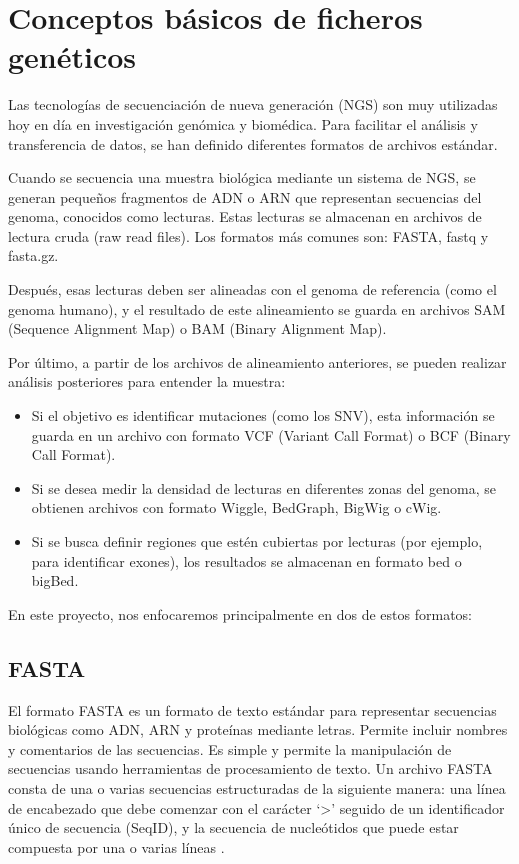 \documentclass[11pt,spanish,listoffigures,listoftables]{tfgetsinf}
\begin{document}
\section{Conceptos básicos de ficheros genéticos}

Las tecnologías de secuenciación de nueva generación (\acs{NGS}) son muy utilizadas hoy en día en investigación genómica y biomédica. Para facilitar el análisis y transferencia de datos, se han definido diferentes formatos de archivos estándar. 

Cuando se secuencia una muestra biológica mediante un sistema de \acs{NGS}, se generan pequeños fragmentos de \acs{ADN} o \acs{ARN} que representan secuencias del genoma, conocidos como lecturas. Estas lecturas se almacenan en archivos de lectura cruda (raw read files). Los formatos más comunes son: \acs{FASTA}, fastq y fasta.gz. 

Después, esas lecturas deben ser alineadas con el genoma de referencia (como el genoma humano), y el resultado de este alineamiento se guarda en archivos SAM (Sequence Alignment Map) o BAM (Binary Alignment Map). 

Por último, a partir de los archivos de alineamiento anteriores, se pueden realizar análisis posteriores para entender la muestra:  

\begin{itemize}
   \item Si el objetivo es identificar mutaciones (como los SNV), esta información se guarda en un archivo con formato \acs{VCF} (Variant Call Format) o BCF (Binary Call Format). 
   \item Si se desea medir la densidad de lecturas en diferentes zonas del genoma, se obtienen archivos con formato Wiggle, BedGraph, BigWig o cWig.
   \item Si se busca definir regiones que estén cubiertas por lecturas (por ejemplo, para identificar exones), los resultados se almacenan en formato bed o bigBed.
\end{itemize}

En este proyecto, nos enfocaremos principalmente en dos de estos formatos: 

\subsection{FASTA}

El formato \acs{FASTA} es un formato de texto estándar para representar secuencias biológicas como \acs{ADN}, \acs{ARN} y proteínas mediante letras. Permite incluir nombres y comentarios de las secuencias. Es simple y permite la manipulación de secuencias usando herramientas de procesamiento de texto\cite{JAV}. Un archivo \acs{FASTA} consta de una o varias secuencias estructuradas de la siguiente manera: una línea de encabezado que debe comenzar con el carácter ‘>’ seguido de un identificador único de secuencia (SeqID), y la secuencia de nucleótidos que puede estar compuesta por una o varias líneas \cite{FAS}.
\end{document}
